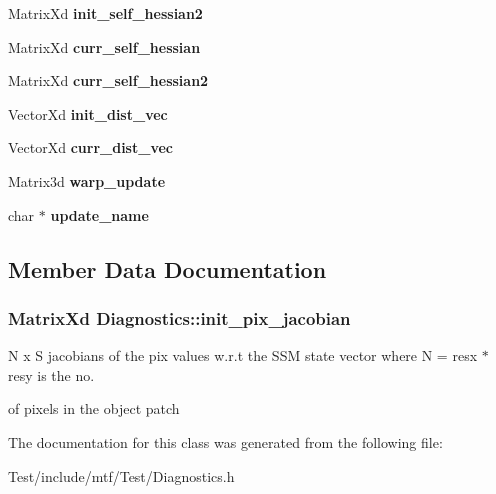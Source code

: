 \begin{DoxyCompactItemize}
\item 
\hypertarget{classDiagnostics_ac426c9c540ac32ff721da5c6b979b419}{Matrix\-Xd {\bfseries init\-\_\-self\-\_\-hessian2}}\label{classDiagnostics_ac426c9c540ac32ff721da5c6b979b419}

\item 
\hypertarget{classDiagnostics_ac4ee422a13848bdcf678af0337ac64b3}{Matrix\-Xd {\bfseries curr\-\_\-self\-\_\-hessian}}\label{classDiagnostics_ac4ee422a13848bdcf678af0337ac64b3}

\item 
\hypertarget{classDiagnostics_abaa5455c6d26b4ec15e774b28f95dcd0}{Matrix\-Xd {\bfseries curr\-\_\-self\-\_\-hessian2}}\label{classDiagnostics_abaa5455c6d26b4ec15e774b28f95dcd0}

\item 
\hypertarget{classDiagnostics_a2af3fb7574813574f5cec2215469cd01}{Vector\-Xd {\bfseries init\-\_\-dist\-\_\-vec}}\label{classDiagnostics_a2af3fb7574813574f5cec2215469cd01}

\item 
\hypertarget{classDiagnostics_aeb0d7308c472a2319b0e2390e90879a8}{Vector\-Xd {\bfseries curr\-\_\-dist\-\_\-vec}}\label{classDiagnostics_aeb0d7308c472a2319b0e2390e90879a8}

\item 
\hypertarget{classDiagnostics_a749cd007342b2086f3fff83e70086d59}{Matrix3d {\bfseries warp\-\_\-update}}\label{classDiagnostics_a749cd007342b2086f3fff83e70086d59}

\item 
\hypertarget{classDiagnostics_a9630a4d0e76ba39701877fb6ebcb533a}{char $\ast$ {\bfseries update\-\_\-name}}\label{classDiagnostics_a9630a4d0e76ba39701877fb6ebcb533a}

\end{DoxyCompactItemize}


\subsection{Member Data Documentation}
\hypertarget{classDiagnostics_a1a89abf10430a264cd699d0f4f199fd2}{
\subsubsection[{init\-\_\-pix\-\_\-jacobian}]{\setlength{\rightskip}{0pt plus 5cm}Matrix\-Xd Diagnostics\-::init\-\_\-pix\-\_\-jacobian}}\label{classDiagnostics_a1a89abf10430a264cd699d0f4f199fd2}


N x S jacobians of the pix values w.\-r.\-t the S\-S\-M state vector where N = resx $\ast$ resy is the no. 

of pixels in the object patch 

The documentation for this class was generated from the following file\-:\begin{DoxyCompactItemize}
\item 
Test/include/mtf/\-Test/Diagnostics.\-h\end{DoxyCompactItemize}
